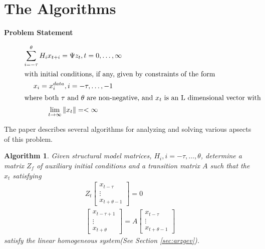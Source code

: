 \documentclass{article}
\newtheorem{rslt}{Algorithm}
\newtheorem{pblm}{Problem Statement}
\begin{document}
{%

    



  

\section{The Algorithms}

\label{alg}

\begin{description}
\item[{\bf Problem Statement}]
\begin{gather}
\sum_{i= - \tau}^\theta { H_i  x_{ t + i } }= \Psi z_{t}, t = 0,\ldots,\infty\label{eq:canonical}\\ \intertext{with initial conditions, if any, given by constraints of the form}
x_i  =  x^{data}_i  ,  i =  - \tau, \ldots , -1 \label{eq:init}\\ \intertext{where both $\tau$ and $\theta$ are non-negative, and $x_t$ is an L dimensional vector with}
\lim_{ t \rightarrow \infty } \|x_t\|  = < \infty  \label{eq:limit}
\end{gather}
\end{description}

The paper describes several algorithms for analyzing and solving
 various apsects of this
problem.

\begin{rslt}
Given {\em structural model matrices}, $H_i, i=-\tau,\ldots,\theta$, 
determine a matrix $Z_f$ of {\em auxiliary initial conditions } and a {\em transition matrix}
$A$ such that the $x_t$ satisfying
\begin{gather*}
Z_t \begin{bmatrix}
  x_{t-\tau}\\\vdots\\x_{t+\theta-1}
\end{bmatrix}=0\\
\begin{bmatrix}
  x_{t-\tau+1}\\\vdots\\x_{t+\theta}
\end{bmatrix}=
A 
\begin{bmatrix}
  x_{t-\tau}\\\vdots\\x_{t+\theta-1}
\end{bmatrix}
\end{gather*}  satisfy the linear homogeneous system(See Section \ref{sec:arzgev}).
\end{rslt}

}
\end{document}
